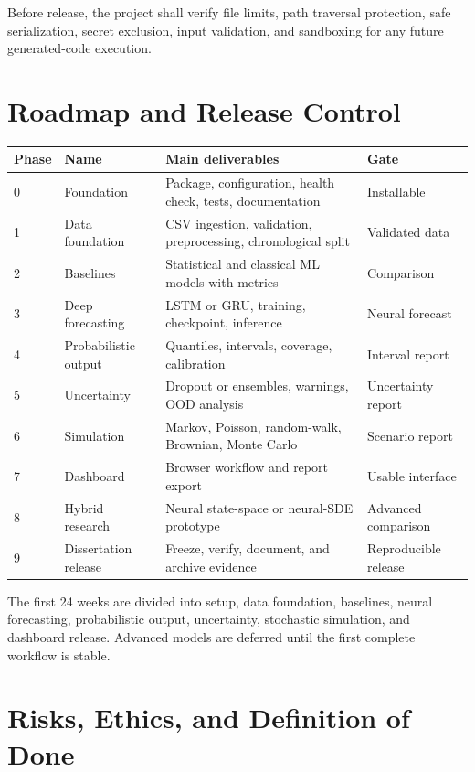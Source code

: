 \documentclass[11pt,a4paper]{report}
\begin{document}
Before release, the project shall verify file limits, path traversal protection, safe serialization, secret exclusion, input validation, and sandboxing for any future generated-code execution.

\chapter{Roadmap and Release Control}

\begin{longtable}{p{1cm}p{3.3cm}p{7.5cm}p{2.3cm}}
\toprule Phase & Name & Main deliverables & Gate \\
\midrule
0 & Foundation & Package, configuration, health check, tests, documentation & Installable \\
1 & Data foundation & CSV ingestion, validation, preprocessing, chronological split & Validated data \\
2 & Baselines & Statistical and classical ML models with metrics & Comparison \\
3 & Deep forecasting & LSTM or GRU, training, checkpoint, inference & Neural forecast \\
4 & Probabilistic output & Quantiles, intervals, coverage, calibration & Interval report \\
5 & Uncertainty & Dropout or ensembles, warnings, OOD analysis & Uncertainty report \\
6 & Simulation & Markov, Poisson, random-walk, Brownian, Monte Carlo & Scenario report \\
7 & Dashboard & Browser workflow and report export & Usable interface \\
8 & Hybrid research & Neural state-space or neural-SDE prototype & Advanced comparison \\
9 & Dissertation release & Freeze, verify, document, and archive evidence & Reproducible release \\
\bottomrule
\end{longtable}

The first 24 weeks are divided into setup, data foundation, baselines, neural forecasting, probabilistic output, uncertainty, stochastic simulation, and dashboard release. Advanced models are deferred until the first complete workflow is stable.

\chapter{Risks, Ethics, and Definition of Done}
\end{document}
